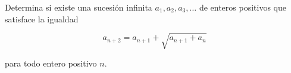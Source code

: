 Determina si existe una sucesión infinita $a_1, a_2, a_3, \dots$ de enteros positivos que satisface
la igualdad

\[a_{n+2}=a_{n+1}+\sqrt{a_{n+1}+a_{n}} \]

para todo entero positivo $n$.
